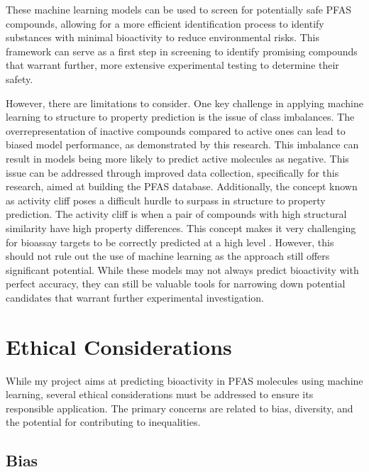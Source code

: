 \documentclass[10pt,twocolumn]{article}
\begin{document}
These machine learning models can be used to screen for potentially safe PFAS compounds, allowing for a more efficient identification process to identify substances with minimal bioactivity to reduce environmental risks. This framework can serve as a first step in screening to identify promising compounds that warrant further, more extensive experimental testing to determine their safety.

However, there are limitations to consider. One key challenge in applying machine learning to structure to property prediction is the issue of class imbalances. The overrepresentation of inactive compounds compared to active ones can lead to biased model performance, as demonstrated by this research. This imbalance can result in models being more likely to predict active molecules as negative. This issue can be addressed through improved data collection, specifically for this research, aimed at building the PFAS database. Additionally, the concept known as activity cliff poses a difficult hurdle to surpass in structure to property prediction. The activity cliff is when a pair of compounds with high structural similarity have high property differences. This concept makes it very challenging for bioassay targets to be correctly predicted at a high level \textcite{Activity}. However, this should not rule out the use of machine learning as the approach still offers significant potential. While these models may not always predict bioactivity with perfect accuracy, they can still be valuable tools for narrowing down potential candidates that warrant further experimental investigation. 

\section{Ethical Considerations}

While my project aims at predicting bioactivity in PFAS molecules using machine learning, several ethical considerations must be addressed to ensure its responsible application. The primary concerns are related to bias, diversity, and the potential for contributing to inequalities. 

\subsection{Bias}
\end{document}
